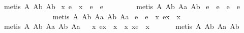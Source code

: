 \begin{isabellebody}
\ {\isacharparenleft}metis\ A{}\ A{}b\ A{}b{\isacharparenright}%
\endisatagproof
{\isafoldproof}%
%
\isadelimproof
%
\endisadelimproof
\isanewline
{}\isamarkupfalse%
\ {\isachardoublequoteopen}{\isacharparenleft}\isactrlbold {\isasymexists}x{\isachardot}\ e\ {\isasymapprox}\ {\isacharparenleft}x{\isasymbox}{\isacharparenright}{\isacharparenright}\ \isactrlbold {\isasymleftrightarrow}\ e\ {\isasymapprox}\ {\isacharparenleft}{\isasymbox}e{\isacharparenright}{\isachardoublequoteclose}%
\isadelimproof
\ \ \ \ \ \ \ %
\endisadelimproof
%
\isatagproof
{}\isamarkupfalse%
\ {\isacharparenleft}metis\ A{}\ A{}b\ A{}a\ A{}b{\isacharparenright}%
\endisatagproof
{\isafoldproof}%
%
\isadelimproof
%
\endisadelimproof
\isanewline
{}\isamarkupfalse%
\ {\isachardoublequoteopen}e\ {\isasymapprox}\ {\isacharparenleft}{\isasymbox}e{\isacharparenright}\ \isactrlbold {\isasymleftrightarrow}\ e\ {\isasymapprox}\ {\isacharparenleft}e{\isasymbox}{\isacharparenright}{\isachardoublequoteclose}%
\isadelimproof
\ \ \ \ \ \ \ \ \ \ \ \ \ %
\endisadelimproof
%
\isatagproof
{}\isamarkupfalse%
\ {\isacharparenleft}metis\ A{}\ A{}b\ A{}a\ A{}b\ A{}a{\isacharparenright}%
\endisatagproof
{\isafoldproof}%
%
\isadelimproof
%
\endisadelimproof
\isanewline
{}\isamarkupfalse%
\ {\isachardoublequoteopen}e\ {\isasymapprox}\ {\isacharparenleft}e{\isasymbox}{\isacharparenright}\ \isactrlbold {\isasymleftrightarrow}\ {\isacharparenleft}\isactrlbold {\isasymforall}x{\isachardot}\ e{\isasymcdot}x\ {\isasymgreaterapprox}\ x{\isacharparenright}{\isachardoublequoteclose}%
\isadelimproof
\ \ \ \ \ \ \ \ \ %
\endisadelimproof
%
\isatagproof
{}\isamarkupfalse%
\ {\isacharparenleft}metis\ A{}\ A{}b\ A{}a\ A{}b\ A{}a{\isacharparenright}%
\endisatagproof
{\isafoldproof}%
%
\isadelimproof
%
\endisadelimproof
\ \isanewline
{}\isamarkupfalse%
\ {\isachardoublequoteopen}{\isacharparenleft}\isactrlbold {\isasymforall}x{\isachardot}\ e{\isasymcdot}x\ {\isasymgreaterapprox}\ x{\isacharparenright}\ \isactrlbold {\isasymleftrightarrow}\ {\isacharparenleft}\isactrlbold {\isasymforall}x{\isachardot}\ x{\isasymcdot}e\ {\isasymgreaterapprox}\ x{\isacharparenright}{\isachardoublequoteclose}%
\isadelimproof
\ \ \ \ \ %
\endisadelimproof
%
\isatagproof
{}\isamarkupfalse%
\ {\isacharparenleft}metis\ A{}\ A{}b\ A{}a\ A{}b{\isacharparenright}%

\end{isabellebody}
